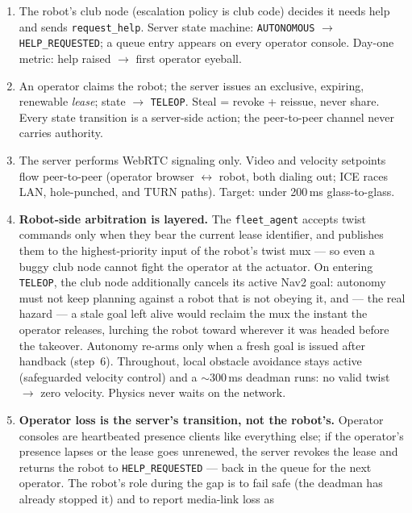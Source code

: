 \documentclass[11pt]{article}
\begin{document}
\begin{enumerate}[itemsep=1pt]
  \item The robot's club node (escalation policy is club code) decides it needs help
        and sends \texttt{request\_help}. Server state machine: \texttt{AUTONOMOUS}
        $\to$ \texttt{HELP\_REQUESTED}; a queue entry appears on every operator
        console. Day-one metric: help raised $\to$ first operator eyeball.
  \item An operator claims the robot; the server issues an exclusive, expiring,
        renewable \emph{lease}; state $\to$ \texttt{TELEOP}. Steal = revoke + reissue,
        never share. Every state transition is a server-side action; the peer-to-peer
        channel never carries authority.
  \item The server performs WebRTC signaling only. Video and velocity setpoints flow
        peer-to-peer (operator browser $\leftrightarrow$ robot, both dialing out; ICE
        races LAN, hole-punched, and TURN paths). Target: under 200\,ms
        glass-to-glass.
  \item \textbf{Robot-side arbitration is layered.} The \texttt{fleet\_agent} accepts
        twist commands only when they bear the current lease identifier, and
        publishes them to the highest-priority input of the robot's twist mux --- so
        even a buggy club node cannot fight the operator at the actuator. On entering
        \texttt{TELEOP}, the club node additionally cancels its active Nav2 goal:
        autonomy must not keep planning against a robot that is not obeying it, and
        --- the real hazard --- a stale goal left alive would reclaim the mux the
        instant the operator releases, lurching the robot toward wherever it was
        headed before the takeover. Autonomy re-arms only when a fresh goal is issued
        after handback (step~6). Throughout, local obstacle avoidance stays active
        (safeguarded velocity control) and a $\sim$300\,ms deadman runs: no valid
        twist $\to$ zero velocity. Physics never waits on the network.
  \item \textbf{Operator loss is the server's transition, not the robot's.} Operator
        consoles are heartbeated presence clients like everything else; if the
        operator's presence lapses or the lease goes unrenewed, the server revokes
        the lease and returns the robot to \texttt{HELP\_REQUESTED} --- back in the
        queue for the next operator. The robot's role during the gap is to fail safe
        (the deadman has already stopped it) and to report media-link loss as

\end{enumerate}
\end{document}
